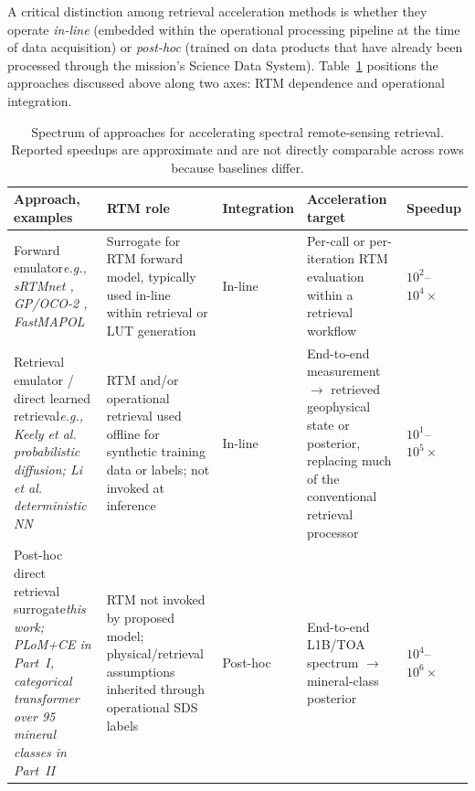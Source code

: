 \documentclass[11pt]{report}
\begin{document}
A critical distinction among retrieval acceleration methods is whether they operate \emph{in-line} (embedded within the operational processing pipeline at the time of data acquisition) or \emph{post-hoc} (trained on data products that have already been processed through the mission's Science Data System). Table~\ref{tab:emulation_spectrum} positions the approaches discussed above along two axes: RTM dependence and operational integration.

\begin{table}[htbp]
\centering
\caption{Spectrum of approaches for accelerating spectral remote-sensing retrieval. Reported speedups are approximate and are not directly comparable across rows because baselines differ.}
\label{tab:emulation_spectrum}
\begin{tabular}{p{}p{}p{}p{}p{}}
\hline
\rowcolor[gray]{0.85}
\textbf{Approach, examples} & \textbf{RTM role} & \textbf{Integration} & \textbf{Acceleration target} & \textbf{Speedup} \\
\hline
Forward emulator\newline \emph{e.g., sRTMnet \cite{brodrick2021}, GP/OCO-2 \cite{lamminpaa2025}, FastMAPOL \cite{gao2023}} & Surrogate for RTM forward model, typically used in-line within retrieval or LUT generation & In-line & Per-call or per-iteration RTM evaluation within a retrieval workflow & $10^2$--$10^4\times$ \\
\hline
Retrieval emulator / direct learned retrieval\newline \emph{e.g., Keely et al.~\cite{Keely2025ConditionalDiffusionCO2} probabilistic diffusion; Li et al.~\cite{Li2022NO2NN} deterministic NN} & RTM and/or operational retrieval used offline for synthetic training data or labels; not invoked at inference & In-line & End-to-end measurement $\to$ retrieved geophysical state or posterior, replacing much of the conventional retrieval processor & $10^1$--$10^5\times$ \\
\hline
Post-hoc direct retrieval surrogate\newline \emph{this work; PLoM+CE in Part~I, categorical transformer over 95 mineral classes in Part~II} & RTM not invoked by proposed model; physical/retrieval assumptions inherited through operational SDS labels & Post-hoc & End-to-end L1B/TOA spectrum $\to$ mineral-class posterior & $10^4$--$10^6\times$ \\
\hline
\end{tabular}
\end{table}
\end{document}
